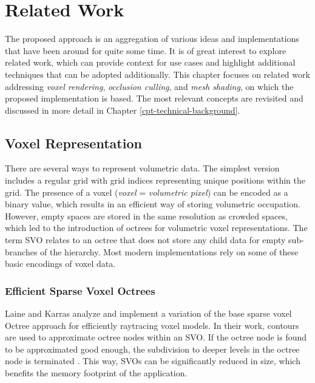 \chapter{Related Work} \label{cpt-related-work}

The proposed approach is an aggregation of various ideas and implementations that have been 
around for quite some time. It is of great interest to explore related work, which can provide 
context for use cases and highlight additional techniques that can be adopted additionally. 
This chapter focuses on related work addressing \emph{voxel rendering}, \emph{occlusion culling}, 
and \emph{mesh shading}, on which the proposed implementation is based. The most relevant concepts 
are revisited and discussed in more detail in Chapter \ref{cpt-technical-background}. 


\section{Voxel Representation} \label{sec-voxel-representation}

There are several ways to represent volumetric data. The simplest version includes a regular 
grid with grid indices representing unique positions within the grid. The presence of a voxel 
(\emph{voxel} = \emph{volumetric pixel}) can be encoded as a binary value, which results in 
an efficient way of storing volumetric occupation. However, empty spaces are stored in the 
same resolution as crowded spaces, which led to the introduction of octrees for volumetric 
voxel representations. The term \ac{SVO} relates to an octree that does not store any child 
data for empty sub-branches of the hierarchy. Most modern implementations rely on some of 
these basic encodings of voxel data. 


\subsection*{Efficient Sparse Voxel Octrees}

Laine and Karras \cite{Laine2010} analyze and implement a variation of the base sparse voxel Octree approach for 
efficiently raytracing voxel models. In their work, contours are used to approximate octree nodes within an \ac{SVO}. 
If the octree node is found to be approximated good enough, the subdivision to deeper levels in the octree node is 
terminated \cite{Kampe2013,Laine2010}. This way, \ac{SVO}s can be significantly reduced in size, which benefits 
the memory footprint of the application. \\

